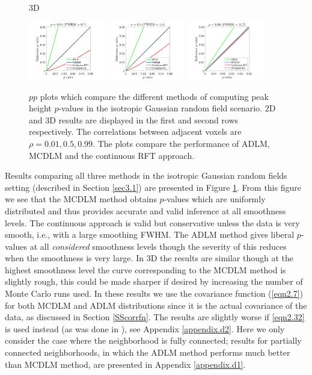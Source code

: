 \documentclass{article}
\newcommand{\nt}[1]{\textit{\color{red} #1}}
\begin{document}
\begin{figure}[!htp]
\begin{sideways}
\phantom{------------------}3D
\end{sideways}
\includegraphics[trim=80 5 80 5, clip,width=0.3\textwidth]{figure/3D_rho0.01_disc.jpg}
\includegraphics[trim=80 5 80 5, clip,width=0.3\textwidth]{figure/3D_rho0.5_disc.jpg}
\includegraphics[trim=100 5 100 5, clip,width=0.3\textwidth]{figure/3D_rho0.99_disc.jpg}
\caption{$pp$ plots which compare the different methods of computing peak height $p$-values in the isotropic Gaussian random field scenario. 2D and 3D results are displayed in the first and second rows respectively. The correlations between adjacent voxels are $\rho = 0.01, 0.5, 0.99$. The plots compare the performance of ADLM, MCDLM and the continuous RFT approach.\label{fig7}}
\end{figure}


Results comparing all three methods in the isotropic Gaussian random fields setting (described in Section \ref{sec3.1}) are presented in Figure \ref{fig7}. From this figure we see that the MCDLM method obtains $p$-values which are uniformly distributed and thus provides accurate and valid inference
at all smoothness levels. The continuous approach is valid but conservative unless the data is very smooth, i.e., with a large smoothing FWHM. The ADLM method gives liberal $p$-values at all \nt{considered} smoothness levels though the severity of this reduces when the smoothness is very large. In 3D the results are similar though at the highest smoothness level the curve corresponding to the MCDLM method is slightly rough, this could be made sharper if desired by increasing the number of Monte Carlo runs used. In these results we use the covariance function (\ref{eqn2.7}) for both MCDLM and ADLM distributions since it is the actual covariance of the data, as discussed in Section \ref{SScorrfn}. The results are slightly worse if \eqref{eqn2.32} is used instead (as was done in \cite{worsley2005improved, taylor2007maxima}), see Appendix \ref{appendix.d2}. Here we only consider the case where the neighborhood is fully connected; results for
partially connected neighborhoods, in which the ADLM method performs much better than MCDLM method, are presented in Appendix \ref{appendix.d1}.
\end{document}
